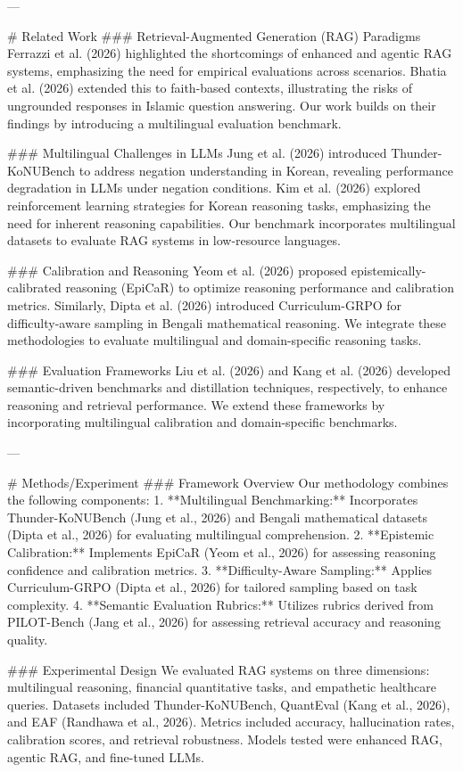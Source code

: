 ---

# Related Work  
### Retrieval-Augmented Generation (RAG) Paradigms  
Ferrazzi et al. (2026) highlighted the shortcomings of enhanced and agentic RAG systems, emphasizing the need for empirical evaluations across scenarios. Bhatia et al. (2026) extended this to faith-based contexts, illustrating the risks of ungrounded responses in Islamic question answering. Our work builds on their findings by introducing a multilingual evaluation benchmark.

### Multilingual Challenges in LLMs  
Jung et al. (2026) introduced Thunder-KoNUBench to address negation understanding in Korean, revealing performance degradation in LLMs under negation conditions. Kim et al. (2026) explored reinforcement learning strategies for Korean reasoning tasks, emphasizing the need for inherent reasoning capabilities. Our benchmark incorporates multilingual datasets to evaluate RAG systems in low-resource languages.

### Calibration and Reasoning  
Yeom et al. (2026) proposed epistemically-calibrated reasoning (EpiCaR) to optimize reasoning performance and calibration metrics. Similarly, Dipta et al. (2026) introduced Curriculum-GRPO for difficulty-aware sampling in Bengali mathematical reasoning. We integrate these methodologies to evaluate multilingual and domain-specific reasoning tasks.

### Evaluation Frameworks  
Liu et al. (2026) and Kang et al. (2026) developed semantic-driven benchmarks and distillation techniques, respectively, to enhance reasoning and retrieval performance. We extend these frameworks by incorporating multilingual calibration and domain-specific benchmarks.

---

# Methods/Experiment  
### Framework Overview  
Our methodology combines the following components:  
1. **Multilingual Benchmarking:** Incorporates Thunder-KoNUBench (Jung et al., 2026) and Bengali mathematical datasets (Dipta et al., 2026) for evaluating multilingual comprehension.  
2. **Epistemic Calibration:** Implements EpiCaR (Yeom et al., 2026) for assessing reasoning confidence and calibration metrics.  
3. **Difficulty-Aware Sampling:** Applies Curriculum-GRPO (Dipta et al., 2026) for tailored sampling based on task complexity.  
4. **Semantic Evaluation Rubrics:** Utilizes rubrics derived from PILOT-Bench (Jang et al., 2026) for assessing retrieval accuracy and reasoning quality.

### Experimental Design  
We evaluated RAG systems on three dimensions: multilingual reasoning, financial quantitative tasks, and empathetic healthcare queries. Datasets included Thunder-KoNUBench, QuantEval (Kang et al., 2026), and EAF (Randhawa et al., 2026). Metrics included accuracy, hallucination rates, calibration scores, and retrieval robustness. Models tested were enhanced RAG, agentic RAG, and fine-tuned LLMs.

